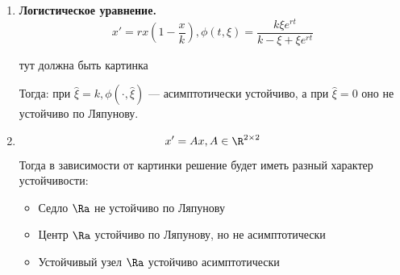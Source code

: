 \begin{enumerate}
    \item \textbf{Логистическое уравнение.} 
    \[x' = rx\left( 1 - \frac{x}{k} \right), \phi(t, \xi) = \frac{k\xi e^{rt}}{k - \xi + \xi e^{rt}}\]

    \begin{center}
        тут должна быть картинка
    \end{center}

    Тогда: при \(\hat{\xi} = k, \phi(\cdot, \hat{\xi})\) --- асимптотически устойчиво, а при \(\hat{\xi} = 0\) оно не устойчиво по Ляпунову.

    \item 
    \[x' = Ax, A \in \R^{2 \times 2}\]
    Тогда в зависимости от картинки решение будет иметь разный характер устойчивости:
    \begin{itemize}
        \item Седло \(\Ra\) не устойчиво по Ляпунову
        \item Центр \(\Ra\) устойчиво по Ляпунову, но не асимптотически
        \item Устойчивый узел \(\Ra\) устойчиво асимптотически
    \end{itemize}
\end{enumerate}

